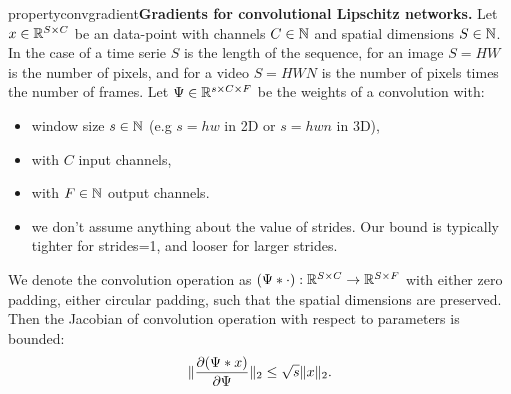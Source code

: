     \begin{restatable}{property}{convgradient}{\normalfont\textbf{Gradients for convolutional Lipschitz networks.}}
        Let $x\in\mathbb{R}^{S\times C}$ be an data-point with channels $C\in\mathbb{N}$ and spatial dimensions $S\in\mathbb{N}$. In the case of a time serie $S$ is the length of the sequence, for an image $S=HW$ is the number of pixels, and for a video $S=HWN$ is the number of pixels times the number of frames.  
        Let $\Psi\in\mathbb{R}^{s\times C\times F}$ be the weights of a convolution with:
        \begin{itemize}
            \item window size $s\in\mathbb{N}$ (e.g $s=hw$ in 2D or $s=hwn$ in 3D),
            \item with $C$ input channels,
            \item with $F\in\mathbb{N}$ output channels.
            \item we don't assume anything about the value of strides. Our bound is typically tighter for strides=1, and looser for larger strides.
        \end{itemize}
        We denote the convolution operation as $(\Psi*\cdot):\mathbb{R}^{S\times C}\rightarrow\mathbb{R}^{S\times F}$ with either zero padding, either circular padding, such that the spatial dimensions are preserved.  
        Then the Jacobian of convolution operation with respect to parameters is bounded:
        \begin{equation}
            \|\frac{\partial (\Psi*x)}{\partial \Psi}\|_2\leq \sqrt{s}\|x\|_2.
        \end{equation}
    \end{restatable}
